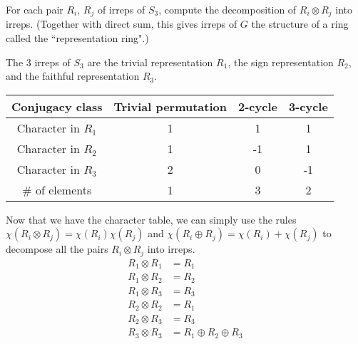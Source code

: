 \documentclass{article}
\begin{document}
\bigskip
\begin{prob}
    For each pair $R_i$, $R_j$ of irreps of $S_3$, compute the decomposition of $R_i \otimes R_j$ into irreps. (Together with direct sum, this gives irreps of $G$ the structure of a ring called the ``representation ring".)
\end{prob}
The 3 irreps of $S_3$ are the trivial representation $R_1$, the sign representation $R_2$, and the faithful representation $R_3$.
\begin{center}
    \begin{tabular}{c|ccc}
        Conjugacy class & Trivial permutation & 2-cycle & 3-cycle \\
        \hline
        Character in $R_1$ & 1 & 1 & 1 \\
        Character in $R_2$ & 1 & -1 & 1 \\
        Character in $R_3$ & 2 & 0 & -1 \\
        \hline
        \# of elements & 1 & 3 & 2
    \end{tabular}
\end{center}
Now that we have the character table, we can simply use the rules $\chi(R_i \otimes R_j)=\chi(R_i)\chi(R_j)$ and $\chi(R_i \oplus R_j) = \chi(R_i) + \chi(R_j)$ to decompose all the pairs $R_i \otimes R_j$ into irreps.
\begin{align*}
    R_1 \otimes R_1 &= R_1 \\
    R_1 \otimes R_2 &= R_2 \\
    R_1 \otimes R_3 &= R_3 \\
    R_2 \otimes R_2 &= R_1 \\
    R_2 \otimes R_3 &= R_3 \\
    R_3 \otimes R_3 &= R_1 \oplus R_2 \oplus R_3 \\
\end{align*}
\end{document}
